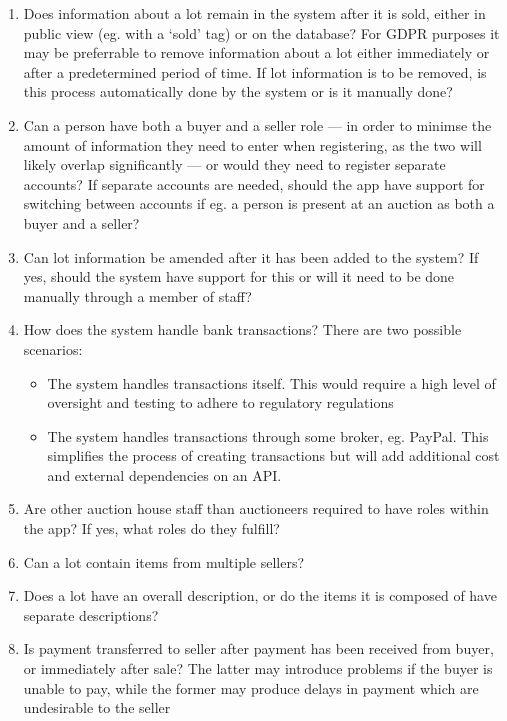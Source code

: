 \documentclass[titlepage, 12pt]{extarticle}
\begin{document}
\begin{enumerate}
\item Does information about a lot remain in the system after it is sold, either in public view (eg. with a `sold' tag) or on the database? For GDPR purposes it may be preferrable to remove information about a lot either immediately or after a predetermined period of time. If lot information is to be removed, is this process automatically done by the system or is it manually done?
\item Can a person have both a buyer and a seller role --- in order to minimse the amount of information they need to enter when registering, as the two will likely overlap significantly --- or would they need to register separate accounts? If separate accounts are needed, should the app have support for switching between accounts if eg. a person is present at an auction as both a buyer and a seller?
\item Can lot information be amended after it has been added to the system? If yes, should the system have support for this or will it need to be done manually through a member of staff?
\item How does the system handle bank transactions? There are two possible scenarios:
  \begin{itemize}
  \item The system handles transactions itself. This would require a high level of oversight and testing to adhere to regulatory regulations
  \item The system handles transactions through some broker, eg. PayPal. This simplifies the process of creating transactions but will add additional cost and external dependencies on an API. 
  \end{itemize}
\item Are other auction house staff than auctioneers required to have roles within the app? If yes, what roles do they fulfill?
\item Can a lot contain items from multiple sellers? 
\item Does a lot have an overall description, or do the items it is composed of have separate descriptions?
\item Is payment transferred to seller after payment has been received from buyer, or immediately after sale? The latter may introduce problems if the buyer is unable to pay, while the former may produce delays in payment which are undesirable to the seller
\end{enumerate}
\end{document}

